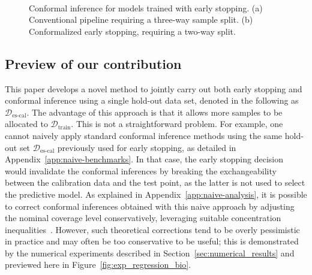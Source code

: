 \begin{figure}[!htb]
  \centering
  ~~~~~
  \caption{Conformal inference for models trained with early stopping. (a) Conventional pipeline requiring a three-way sample split. (b) Conformalized early stopping, requiring a two-way split.}
  \label{fig:ces_data_splitting}
\end{figure}


\subsection{Preview of our contribution}

This paper develops a novel method to jointly carry out both early stopping and conformal inference using a single hold-out data set, denoted in the following as  $\mathcal{D}_{\text{es-cal}}$. The advantage of this approach is that it allows more samples to be allocated to  $\mathcal{D}_{\text{train}}$.
This is not a straightforward problem. For example, one cannot naively apply standard conformal inference methods using the same hold-out set $\mathcal{D}_{\text{es-cal}}$ previously used for early stopping, as detailed in Appendix~\ref{app:naive-benchmarks}.
In that case, the early stopping decision would invalidate the conformal inferences by breaking the exchangeability between the calibration data and the test point, as the latter is not used to select the predictive model.
As explained in Appendix~\ref{app:naive-analysis}, it is possible to correct conformal inferences obtained with this naive approach by adjusting the nominal coverage level conservatively, leveraging suitable concentration inequalities~\cite{efficiency_first_cp}. However, such theoretical corrections tend to be overly pessimistic in practice and may often be too conservative to be useful; this is demonstrated by the numerical experiments described in Section~\ref{sec:numerical_results} and previewed here in Figure~\ref{fig:exp_regression_bio}.

